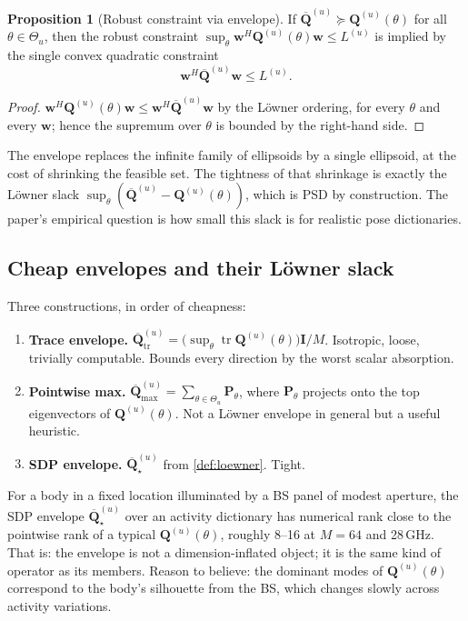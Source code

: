 \documentclass[11pt,a4paper]{article}
\theoremstyle{definition}
\newtheorem{proposition}[proposition]{Proposition}
\newcommand{\ww}{\mathbf{w}}
\newcommand{\ident}{\mathbf{I}}
\newcommand{\Q}{\mathbf{Q}}
\newcommand{\Qbar}{\overline{\mathbf{Q}}}
\DeclareMathOperator{\tr}{tr}
\newcommand{\Poses}{\Theta}
\begin{document}
\begin{proposition}[Robust constraint via envelope]\label{prop:envelope}
If $\Qbar^{(u)}\succeq\Q^{(u)}(\theta)$ for all $\theta\in\Poses_u$,
then the robust constraint
$\sup_\theta\ww^H\Q^{(u)}(\theta)\ww\le L^{(u)}$ is implied by the
single convex quadratic constraint
\[
  \ww^H\Qbar^{(u)}\ww\le L^{(u)}.
\]
\end{proposition}

\begin{proof}
$\ww^H\Q^{(u)}(\theta)\ww\le\ww^H\Qbar^{(u)}\ww$ by the Löwner
ordering, for every $\theta$ and every $\ww$; hence the supremum
over $\theta$ is bounded by the right-hand side.
\end{proof}

The envelope replaces the infinite family of ellipsoids by a single
ellipsoid, at the cost of shrinking the feasible set. The tightness
of that shrinkage is exactly the Löwner slack
$\sup_\theta(\Qbar^{(u)}-\Q^{(u)}(\theta))$, which is PSD by
construction. The paper's empirical question is how small this slack
is for realistic pose dictionaries.

\subsection{Cheap envelopes and their Löwner slack}

Three constructions, in order of cheapness:

\begin{enumerate}[leftmargin=1.6em,itemsep=2pt]
\item \textbf{Trace envelope.}
$\Qbar^{(u)}_{\tr}=\bigl(\sup_\theta\tr\Q^{(u)}(\theta)\bigr)\ident/M$.
Isotropic, loose, trivially computable. Bounds every direction by the
worst scalar absorption.
\item \textbf{Pointwise max.}
$\Qbar^{(u)}_{\max}=\sum_{\theta\in\Poses_u}\mathbf{P}_\theta$,
where $\mathbf{P}_\theta$ projects onto the top eigenvectors of
$\Q^{(u)}(\theta)$. Not a Löwner envelope in general but a useful
heuristic.
\item \textbf{SDP envelope.} $\Qbar^{(u)}_\star$ from
\cref{def:loewner}. Tight.
\end{enumerate}

\begin{conjecture}\label{conj:lowrank}
For a body in a fixed location illuminated by a BS panel of modest
aperture, the SDP envelope $\Qbar^{(u)}_\star$ over an activity
dictionary has numerical rank close to the pointwise rank of a
typical $\Q^{(u)}(\theta)$, roughly 8--16 at $M=64$ and 28\,GHz. That
is: the envelope is not a dimension-inflated object; it is the same
kind of operator as its members. Reason to believe: the dominant
modes of $\Q^{(u)}(\theta)$ correspond to the body's silhouette from
the BS, which changes slowly across activity variations.
\end{conjecture}
\end{document}
